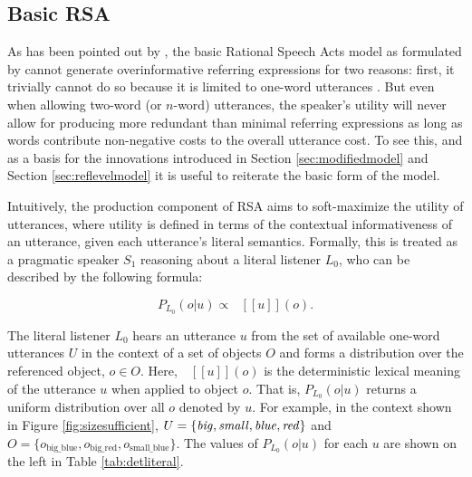\documentclass[11pt]{article}
\newcommand{\denote}[1]{\mbox{ $[\![ #1 ]\!]$}}
\newcommand{\tableref}[1]{Table \ref{#1}}
\newcommand{\figref}[1]{Figure \ref{#1}}
\newcommand{\sectionref}[1]{Section \ref{#1}}
\begin{document}
\subsection{Basic RSA}
\label{sec:basicrsa}

As has been pointed out by , the basic Rational Speech Acts model as formulated by  cannot generate overinformative referring expressions for two reasons: first, it trivially cannot do so because it is limited to one-word utterances \cite<see also>{baumann2014}. But even when allowing two-word (or $n$-word) utterances, the speaker's utility will never allow for producing more redundant than minimal referring expressions as long as words contribute non-negative costs to the overall utterance cost. To see this, and as a basis for the innovations introduced in \sectionref{sec:modifiedmodel} and \sectionref{sec:reflevelmodel} it is useful to reiterate the basic form of the model.

Intuitively, the production component of RSA aims to soft-maximize the utility of utterances, where utility is defined in terms of the contextual informativeness of an utterance, given each utterance's literal semantics. Formally, this is treated as a pragmatic speaker $S_1$ reasoning about a literal listener $L_0$, who can be described by the following formula:

\begin{equation}
P_{L_0}(o | u) \propto \denote{u}(o).
\end{equation}

The literal listener $L_0$ hears an utterance $u$ from the set of available one-word utterances $U$ in the context of a set of objects  $O$ and forms a distribution over the referenced object, $o \in O$. Here, $\denote{u}(o)$ is the deterministic lexical meaning of the utterance $u$ when applied to object $o$. That is, $P_{L_0}(o | u)$ returns a uniform distribution over all $o$ denoted by $u$. For example, in the context shown in \figref{fig:sizesufficient}, $U = \{\textrm{\emph{big}}, \textrm{\emph{small}}, \textrm{\emph{blue}}, \textrm{\emph{red}}\}$ and $O = \{o_{\textrm{big\_blue}}, o_{\textrm{big\_red}}, o_{\textrm{small\_blue}}\}$. The values of $P_{L_0}(o | u)$ for each $u$ are shown on the left in \tableref{tab:detliteral}.
\end{document}
